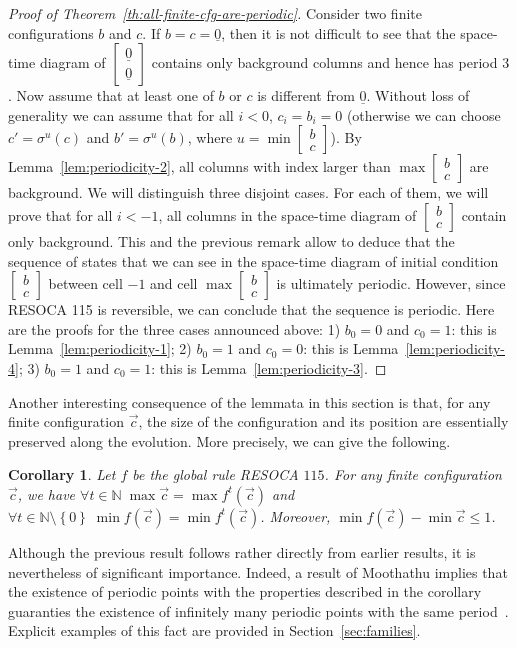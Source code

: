\documentclass[submission,copyright,creativecommons]{eptcs}
\newcommand{\set}[1]{\ensuremath{\left\{#1\right\}}\xspace}
\newcommand{\N}{\ensuremath{\mathbb{N}}\xspace}
\newcommand{\cvres}[2]{\ensuremath{\begin{bmatrix}#1\\#2\end{bmatrix}}\xspace}
\newcommand{\cz}{\ensuremath{\underline{0}}\xspace}
\newtheorem{corollary}{Corollary}
\begin{document}
\begin{proof}[Proof of Theorem~\ref{th:all-finite-cfg-are-periodic}]
Consider two finite configurations $b$ and $c$. If $b=c=\cz$, then it is not difficult to see that the space-time diagram of \cvres{\cz}{\cz} contains only background columns and hence has period $3$. Now assume that at least one
of $b$ or $c$ is different from \cz.
Without loss of generality we can assume that for all $i<0$, $c_i=b_i=0$
(otherwise we can choose $c'=\sigma^u(c)$ and $b'=\sigma^u(b)$, where $u=\min \cvres{b}{c}$).
By Lemma~\ref{lem:periodicity-2}, all
columns with index larger than $\max \cvres{b}{c}$ are background.
We will distinguish three disjoint cases. For each of them, we will prove
that for all $i<-1$, all columns in the space-time diagram of \cvres{b}{c} contain only background. This and the previous remark allow to deduce that
the sequence of states that we can see in the space-time diagram of initial condition \cvres{b}{c} between cell $-1$ and cell $\max\cvres{b}{c}$ is ultimately periodic. However, since RESOCA 115
is reversible, we can conclude that the sequence is periodic. Here are the
proofs for the three cases announced above:
1) $b_0=0$ and $c_0=1$: this is Lemma~\ref{lem:periodicity-1};
2) $b_0=1$ and $c_0=0$: this is Lemma~\ref{lem:periodicity-4};
3) $b_0=1$ and $c_0=1$:
    this is Lemma~\ref{lem:periodicity-3}.
\end{proof}

%
Another interesting consequence of the lemmata in this section is that, for any finite configuration $\vec c$, the size of the configuration and its position are essentially preserved along the evolution. More precisely,
we can give the following.
\begin{corollary}
\label{cor:max-min-finite-cfg}
Let $f$ be the global rule RESOCA $115$. For any finite configuration
$\vec c$, we have
$\forall t\in\N\;\max\vec c=\max f^t(\vec c)$
and
$\forall t\in\N\setminus\set{0}\;\min f(\vec c)=\min f^t(\vec c)
$.
Moreover, $\min f(\vec c)-\min\vec c\leq1$.
\end{corollary}
%
Although the previous result follows rather directly from earlier results, it is nevertheless of significant importance. Indeed, a result of Moothathu implies that the existence of periodic points with the properties described in the corollary guaranties the existence of infinitely many periodic
points with the same period~\cite{Moothathu2005}. Explicit examples of this fact are provided in Section~\ref{sec:families}.
\end{document}
